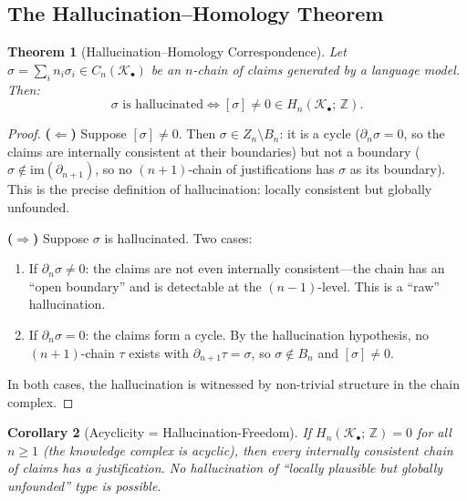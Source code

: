 \documentclass[11pt,a4paper]{article}
\theoremstyle{plain}
\newtheorem{theorem}{Theorem}[section]
\newtheorem{corollary}[theorem]{Corollary}
\theoremstyle{definition}
\newcommand{\im}{\mathrm{im}}
\begin{document}
\subsection{The Hallucination--Homology Theorem}

\begin{theorem}[Hallucination--Homology Correspondence]\label{thm:main}
Let $\sigma = \sum_i n_i \sigma_i \in C_n(\mathcal{K}_\bullet)$ be an $n$-chain of claims generated by a language model. Then:
\begin{equation}\label{eq:main}
  \sigma \text{ is hallucinated} \iff [\sigma] \neq 0 \in H_n(\mathcal{K}_\bullet;\, \mathbb{Z}).
\end{equation}
\end{theorem}

\begin{proof}
\textbf{($\Leftarrow$)} Suppose $[\sigma] \neq 0$. Then $\sigma \in Z_n \setminus B_n$: it is a cycle ($\partial_n \sigma = 0$, so the claims are internally consistent at their boundaries) but not a boundary ($\sigma \notin \im(\partial_{n+1})$, so no $(n+1)$-chain of justifications has $\sigma$ as its boundary). This is the precise definition of hallucination: locally consistent but globally unfounded.

\textbf{($\Rightarrow$)} Suppose $\sigma$ is hallucinated. Two cases:
\begin{enumerate}[nosep]
  \item If $\partial_n \sigma \neq 0$: the claims are not even internally consistent---the chain has an ``open boundary'' and is detectable at the $(n-1)$-level. This is a ``raw'' hallucination.
  \item If $\partial_n \sigma = 0$: the claims form a cycle. By the hallucination hypothesis, no $(n+1)$-chain $\tau$ exists with $\partial_{n+1}\tau = \sigma$, so $\sigma \notin B_n$ and $[\sigma] \neq 0$.
\end{enumerate}
In both cases, the hallucination is witnessed by non-trivial structure in the chain complex.
\end{proof}

\begin{corollary}[Acyclicity = Hallucination-Freedom]\label{cor:acyclic}
If $H_n(\mathcal{K}_\bullet;\, \mathbb{Z}) = 0$ for all $n \geq 1$ (the knowledge complex is acyclic), then every internally consistent chain of claims has a justification. No hallucination of ``locally plausible but globally unfounded'' type is possible.
\end{corollary}
\end{document}
